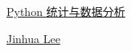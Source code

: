\documentclass[11pt]{article}
\begin{document}
	\kaishu 
	\setcounter{section}{0}
	\begin{center}
		{\LARGE  \href{https://github.com/jinhualee/datashine}{Python 统计与数据分析}}
		
		
		{\large \href{https://github.com/jinhualee}{Jinhua Lee}}
	\end{center}
\setcounter{page}{1}

\end{document}
